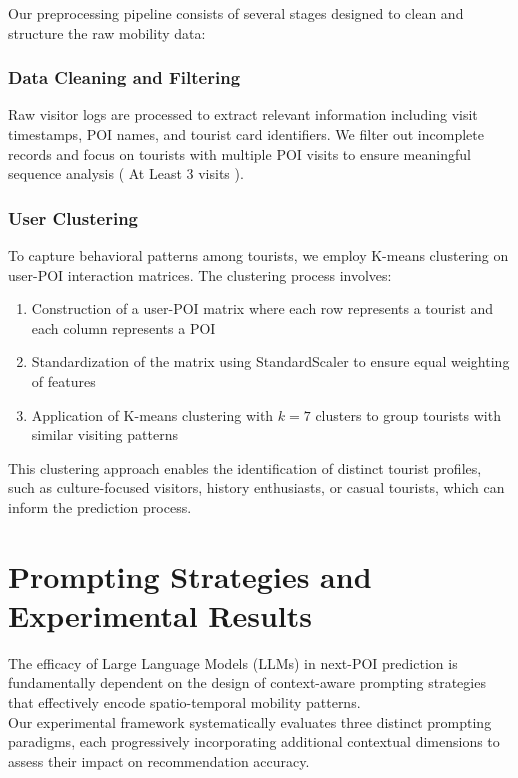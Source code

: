 \documentclass[12pt,a4paper]{article}
\begin{document}
Our preprocessing pipeline consists of several stages designed to clean and structure the raw mobility data:

\subsubsection{Data Cleaning and Filtering}
Raw visitor logs are processed to extract relevant information including visit timestamps, POI names, and tourist card identifiers. We filter out incomplete records and focus on tourists with multiple POI visits to ensure meaningful sequence analysis ( At Least 3 visits ).

\subsubsection{User Clustering}
To capture behavioral patterns among tourists, we employ K-means clustering on user-POI interaction matrices. The clustering process involves:

\begin{enumerate}
\item Construction of a user-POI matrix where each row represents a tourist and each column represents a POI
\item Standardization of the matrix using StandardScaler to ensure equal weighting of features
\item Application of K-means clustering with $k=7$ clusters to group tourists with similar visiting patterns
\end{enumerate}

This clustering approach enables the identification of distinct tourist profiles, such as culture-focused visitors, history enthusiasts, or casual tourists, which can inform the prediction process.

\section{Prompting Strategies and Experimental Results}

The efficacy of Large Language Models (LLMs) in next-POI prediction is fundamentally dependent on the design of context-aware prompting strategies that effectively encode spatio-temporal mobility patterns.\\ Our experimental framework systematically evaluates three distinct prompting paradigms, each progressively incorporating additional contextual dimensions to assess their impact on recommendation accuracy.
\end{document}
